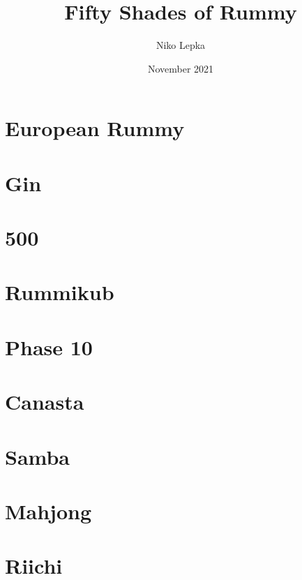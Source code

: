 \documentclass[a5paper]{book}
\title{Fifty Shades of Rummy}
\author{Niko Lepka}
\date{November 2021}
\begin{document}
\maketitle





\section{European Rummy}

\section{Gin}

\section{500}

\section{Rummikub}

\section{Phase 10}

\section{Canasta}

\section{Samba}

\section{Mahjong}

\section{Riichi}
\end{document}
